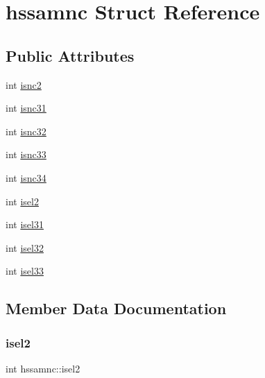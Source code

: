 \hypertarget{structhssamnc}{}\section{hssamnc Struct Reference}
\label{structhssamnc}
\subsection*{Public Attributes}
\begin{DoxyCompactItemize}
\item 
int \hyperlink{structhssamnc_abb9ac51215fc2d2ef640d6a7b891bcb8}{isnc2}
\item 
int \hyperlink{structhssamnc_abe1ecb4b1090ccbc78c64746ad494894}{isnc31}
\item 
int \hyperlink{structhssamnc_a2f40ba584adb8c57b50ebbf216093c98}{isnc32}
\item 
int \hyperlink{structhssamnc_aefc6745cb5504af214fb2edbcf4f0303}{isnc33}
\item 
int \hyperlink{structhssamnc_a9a62d0088d56b3118d6700b64544b53b}{isnc34}
\item 
int \hyperlink{structhssamnc_a635d50227b03e22b263046c6512dee68}{isel2}
\item 
int \hyperlink{structhssamnc_a184df54da9d7e78cae29263d53d16238}{isel31}
\item 
int \hyperlink{structhssamnc_a746d9f1f0f9dfaa77a600f11ad6547d0}{isel32}
\item 
int \hyperlink{structhssamnc_a9d0a0a18eabb0d1eda7e11819ec277ad}{isel33}
\end{DoxyCompactItemize}


\subsection{Member Data Documentation}
\mbox{\label{structhssamnc_a635d50227b03e22b263046c6512dee68}} 
\subsubsection{\texorpdfstring{isel2}{isel2}}
{\footnotesize\ttfamily int hssamnc\+::isel2}

\mbox{\label{structhssamnc_a184df54da9d7e78cae29263d53d16238}} 
